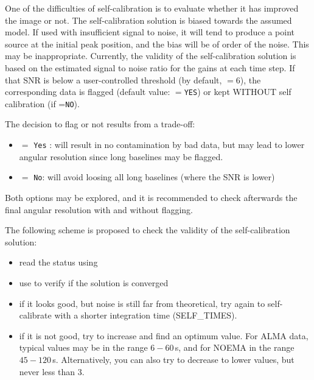 \begin{description}\itemsep 0pt
\item [Validation of the solution] 
One of the difficulties of self-calibration is to evaluate whether
it has improved the image or not. The self-calibration 
solution is biased towards the assumed model. If used with insufficient
signal to noise, it will tend to produce a point source at the
initial peak position, and the bias will be of order of the noise.
This may be inappropriate. 
Currently, the validity of the self-calibration solution is based on 
the estimated signal to noise ratio for the gains at each time step. 
If that SNR is below a user-controlled threshold (by default, $=6$), 
the corresponding data is flagged (default value: $=$\texttt{YES}) 
or kept WITHOUT self calibration (if =\texttt{NO}). 
%
\item [Flagging or not flagging ?] 
The decision to flag or not results from a trade-off:
\begin{itemize}\itemsep 0pt
\item {} $=$ \texttt{Yes} : will result in no contamination by bad data, but
may lead to lower angular resolution since long baselines may be flagged.
\item {} $=$ \texttt{No}: will avoid loosing all long baselines (where the SNR is lower)
\end{itemize}
Both options may be explored, and it is recommended to check afterwards the final angular 
resolution with and without flagging.
\end{description}

The following scheme is proposed to check the validity of the self-calibration solution:
\begin{itemize}\itemsep 0pt
\item read the status using 
\item use  to verify if the solution is converged
\item if it looks good, but noise is still far from theoretical, try 
again to self-calibrate with a shorter integration time (SELF\_TIMES). 
\item if it is not good, try to increase  and find an 
optimum value. For ALMA data, typical values may be in the range 
$6-60$\,s, and for NOEMA in the range $45-120$\,s. Alternatively, you 
can also try to decrease  to lower values, but never
less than 3.
\end{itemize}

